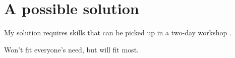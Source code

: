 \section{A possible solution}

My solution requires skills that can be picked up in a two-day workshop \citep{Wilson2014,Wilson2014a}.

Won't fit everyone's need, but will fit most.